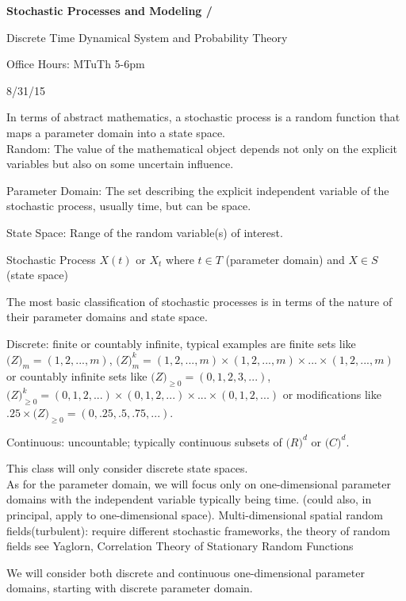 \documentclass[12pt]{article}
\numberwithin{equation}{section}
\begin{document}
\begin{center}
{\bf Stochastic Processes and Modeling
/\bigskip}

Discrete Time Dynamical System and Probability Theory

Office Hours: MTuTh 5-6pm

8/31/15

\end{center}
\vspace{0.2 in}


In terms of abstract mathematics, a stochastic process is a random function that maps a parameter domain into a state space.\\

Random: The value of the mathematical object depends not only on the explicit variables but also on some uncertain influence.

Parameter Domain: The set describing the explicit independent variable of the stochastic process, usually time, but can be space.

State Space: Range of the random variable(s) of interest.

Stochastic Process $X(t)$ or $X_t$ where $t\in T$ (parameter domain) and $X\in S$ (state space)

The most basic classification of stochastic processes is in terms of the nature of their parameter domains and state space.

Discrete: finite or countably infinite, typical examples are finite sets like $\mathbb(Z)_m=(1,2,...,m)$, $\mathbb(Z)_m^k=(1,2,...,m)\times(1,2,...,m)\times ...\times(1,2,...,m)$ or countably infinite sets like $\mathbb(Z)_{\geq 0}=(0,1,2,3,...)$, $\mathbb(Z)^k_{\geq 0}=(0,1,2,...)\times(0,1,2,...)\times ...\times(0,1,2,...)$ or modifications like $.25\times\mathbb(Z)_{\geq 0}=(0,.25,.5,.75,...)$.

Continuous: uncountable; typically continuous subsets of $\mathbb(R)^d$ or $\mathbb(C)^d$.

This class will only consider discrete state spaces.\\

As for the parameter domain, we will focus only on one-dimensional parameter domains with the independent variable typically being time. (could also, in principal, apply to one-dimensional space). Multi-dimensional spatial random fields(turbulent): require different stochastic frameworks, the theory of random fields see Yaglorn, Correlation Theory of Stationary Random Functions

We will consider both discrete and continuous one-dimensional parameter domains, starting with discrete parameter domain.
\end{document}

